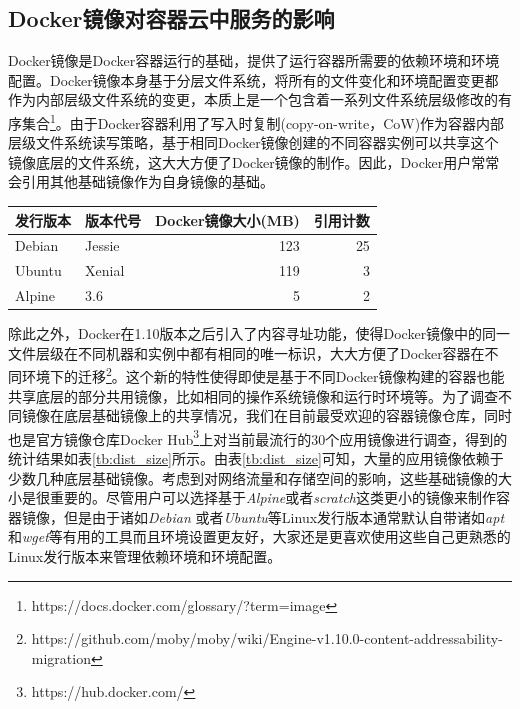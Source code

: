 \subsection{Docker镜像对容器云中服务的影响}
Docker镜像是Docker容器运行的基础，提供了运行容器所需要的依赖环境和环境配置。Docker镜像本身基于分层文件系统，将所有的文件变化和环境配置变更都作为内部层级文件系统的变更，本质上是一个包含着一系列文件系统层级修改的有序集合\footnote{https://docs.docker.com/glossary/?term=image}。由于Docker容器利用了写入时复制(copy-on-write，CoW)作为容器内部层级文件系统读写策略，基于相同Docker镜像创建的不同容器实例可以共享这个镜像底层的文件系统，这大大方便了Docker镜像的制作。因此，Docker用户常常会引用其他基础镜像作为自身镜像的基础。
\begin{table}[h]
\centering
{}
\begin{tabular}{@{}llrr@{}}\toprule
 发行版本 & 版本代号 & Docker镜像大小(MB) & 引用计数 \\ \midrule
 Debian & Jessie & 123 & 25\\
 Ubuntu & Xenial & 119 & 3\\
 Alpine & 3.6 & 5 & 2\\ \bottomrule
\end{tabular}
\end{table}

除此之外，Docker在1.10版本之后引入了内容寻址功能，使得Docker镜像中的同一文件层级在不同机器和实例中都有相同的唯一标识，大大方便了Docker容器在不同环境下的迁移\footnote{https://github.com/moby/moby/wiki/Engine-v1.10.0-content-addressability-migration}。这个新的特性使得即使是基于不同Docker镜像构建的容器也能共享底层的部分共用镜像，比如相同的操作系统镜像和运行时环境等。为了调查不同镜像在底层基础镜像上的共享情况，我们在目前最受欢迎的容器镜像仓库，同时也是官方镜像仓库Docker Hub\footnote{https://hub.docker.com/}上对当前最流行的30个应用镜像进行调查，得到的统计结果如表\ref{tb:dist_size}所示。由表\ref{tb:dist_size}可知，大量的应用镜像依赖于少数几种底层基础镜像。考虑到对网络流量和存储空间的影响，这些基础镜像的大小是很重要的。尽管用户可以选择基于\emph{Alpine}或者\emph{scratch}这类更小的镜像来制作容器镜像，但是由于诸如\emph{Debian} 或者\emph{Ubuntu}等Linux发行版本通常默认自带诸如\emph{apt}和\emph{wget}等有用的工具而且环境设置更友好，大家还是更喜欢使用这些自己更熟悉的Linux发行版本来管理依赖环境和环境配置。

